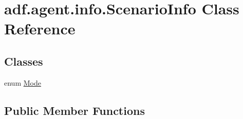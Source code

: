 \hypertarget{classadf_1_1agent_1_1info_1_1ScenarioInfo}{}\section{adf.\+agent.\+info.\+Scenario\+Info Class Reference}
\label{classadf_1_1agent_1_1info_1_1ScenarioInfo}
\subsection*{Classes}
\begin{DoxyCompactItemize}
\item 
enum \hyperlink{enumadf_1_1agent_1_1info_1_1ScenarioInfo_1_1Mode}{Mode}
\end{DoxyCompactItemize}
\subsection*{Public Member Functions}
